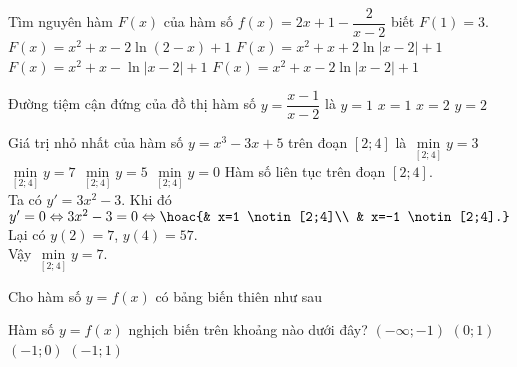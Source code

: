 \begin{ex}%
	Tìm nguyên hàm $F(x)$ của hàm số $f(x)=2x+1-\dfrac{2}{x-2}$ biết $F(1)=3$.
	\choice
	{$F(x)=x^2+x-2\ln(2-x)+1$}
	{$F(x)=x^2+x+2\ln|x-2|+1$}
	{$F(x)=x^2+x-\ln|x-2|+1$}
	{\True $F(x)=x^2+x-2\ln|x-2|+1$}
\end{ex}

\begin{ex}%
	Đường tiệm cận đứng của đồ thị hàm số $y=\dfrac{x-1}{x-2}$ là 
	\choice
	{$y=1$}
	{$x=1$}
	{\True $x=2$}
	{$y=2$}
\end{ex}

\begin{ex}%
	Giá trị nhỏ nhất của hàm số $y=x^3-3x+5$ trên đoạn $[2;4]$ là
	\choice
	{$\min\limits_{[2;4]} y=3$}
	{\True $\min\limits_{[2;4]} y=7$}
	{$\min\limits_{[2;4]} y=5$}
	{$\min\limits_{[2;4]} y=0$}
	\loigiai
	{
		Hàm số liên tục trên đoạn $[2;4]$.\\
		Ta có $y'=3x^2-3$. Khi đó
		$y'=0 \Leftrightarrow 3x^2-3=0 \Leftrightarrow \hoac{& x=1 \notin [2;4]\\ & x=-1 \notin [2;4].}$\\
		Lại có $y(2)=7$, $y(4)=57$.\\
		Vậy $\min\limits_{[2;4]} y=7$.
	}
\end{ex}

\begin{ex}%
	Cho hàm số $y=f(x)$ có bảng biến thiên như sau
	\begin{center}
	\end{center}
	Hàm số $y=f(x)$ nghịch biến trên khoảng nào dưới đây?
	\choice
	{$(-\infty ;-1)$}
	{$(0;1)$}
	{\True $(-1;0)$}
	{$(-1;1)$}
\end{ex}

